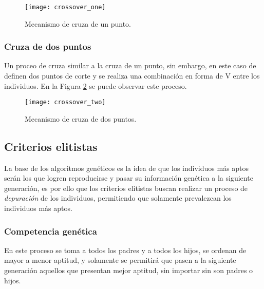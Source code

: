 \begin{figure}[htbp]
	\centering
	\texttt{[image: crossover\_one]}
	\caption{Mecanismo de cruza de un punto.}
	\label{fig: cross_one}
\end{figure}

\subsubsection{Cruza de dos puntos}
Un proceo de cruza similar a la cruza de un punto, sin embargo, en este caso de definen dos puntos de corte y se realiza una combinación en forma de V entre los individuos. En la Figura \ref{fig: cross_two} se puede observar este proceso.

\begin{figure}[htbp]
	\centering
	\texttt{[image: crossover\_two]}
	\caption{Mecanismo de cruza de dos puntos.}
	\label{fig: cross_two}
\end{figure}

\subsection{Criterios elitistas}
La base de los algoritmos genéticos es la idea de que los individuos más aptos serán los que logren reproducirse y pasar su información genética a la siguiente generación, es por ello que los criterios elitistas buscan realizar un proceso de \textit{depuración} de los individuos, permitiendo que solamente prevalezcan los individuos más aptos.

\subsubsection{Competencia genética}
En este proceso se toma a todos los padres y a todos los hijos, se ordenan de mayor a menor aptitud, y solamente se permitirá que pasen a la siguiente generación aquellos que presentan mejor aptitud, sin importar sin son padres o hijos.